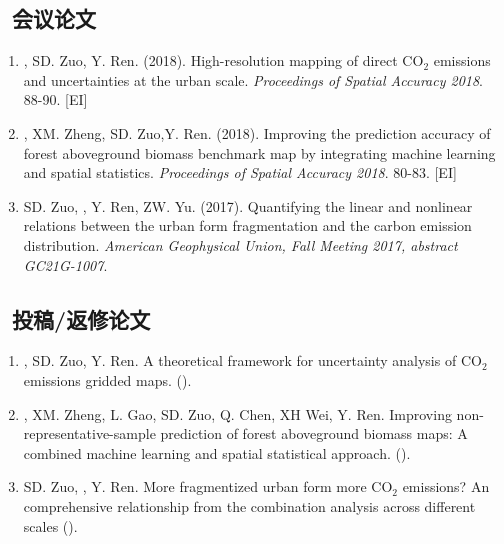 \subsection*{\texorpdfstring{\faBook\ 会议论文}{会议论文}}
\begin{enumerate}
\item
    \Shaoqing, SD. Zuo, Y. Ren. (2018).
    High-resolution mapping of direct CO$_2$ emissions and uncertainties at the urban scale.
    \textit{Proceedings of Spatial Accuracy 2018}. 88-90. [EI]
\item
    \Shaoqing\CF, XM. Zheng, SD. Zuo,Y. Ren. (2018).
    Improving the prediction accuracy of forest aboveground biomass benchmark map by integrating machine learning and spatial statistics.
    \textit{Proceedings of Spatial Accuracy 2018}. 80-83. [EI]
\item
    SD. Zuo, \Shaoqing, Y. Ren, ZW. Yu. (2017).
    Quantifying the linear and nonlinear relations between the urban form fragmentation and the carbon emission distribution.
    \textit{American Geophysical Union, Fall Meeting 2017, abstract GC21G-1007}.
\end{enumerate}

\subsection*{\texorpdfstring{\faBook\ 投稿/返修论文}{投稿/返修论文}}
\begin{enumerate}
\item
    \Shaoqing, SD. Zuo, Y. Ren.
   A theoretical framework for uncertainty analysis of CO$_2$ emissions gridded maps. 
    (\Submitted).
\item
    \Shaoqing\CF, XM. Zheng, L. Gao, SD. Zuo, Q. Chen, XH Wei, Y. Ren.
    Improving non-representative-sample prediction of forest aboveground biomass maps: A combined machine learning and spatial statistical approach. 
    (\Review).
\item
    SD. Zuo, \Shaoqing, Y. Ren.
    More fragmentized urban form more CO$_2$ emissions? An comprehensive relationship from the combination analysis across different scales 
    (\Revision).
\end{enumerate}
